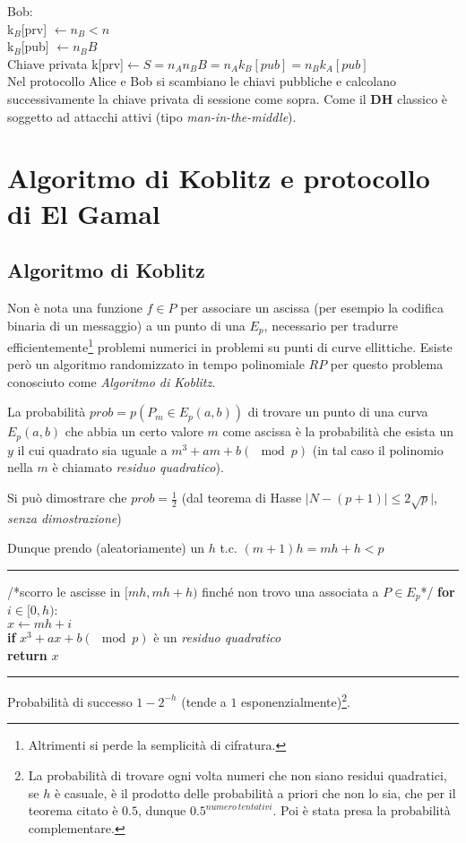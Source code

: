 \documentclass{article}
\begin{document}
Bob:\\
\indent\indent k$_B$[prv] $\leftarrow n_B < n$\\
\indent\indent k$_B$[pub] $\leftarrow n_B B$\\

Chiave privata k[prv]$\leftarrow S = n_A n_B B = n_A k_B [pub]= n_B k_A[pub]$\\
Nel protocollo Alice e Bob si scambiano le chiavi pubbliche e calcolano successivamente la chiave privata di sessione come sopra. Come il \textbf{DH} classico è soggetto ad attacchi attivi (tipo \textit{man-in-the-middle}).

\section{Algoritmo di Koblitz e protocollo di El Gamal}
\subsection{Algoritmo di Koblitz}
Non è nota una funzione $f\in P$ per associare un ascissa (per esempio la codifica binaria di un messaggio) a un punto di una $E_p$, necessario per tradurre efficientemente\footnote{Altrimenti si perde la semplicità di cifratura.} problemi numerici in problemi su punti di curve ellittiche. Esiste però un algoritmo randomizzato in tempo polinomiale $RP$ per questo problema conosciuto come \textit{Algoritmo di Koblitz}.

La probabilità $prob=p(P_m\in E_p(a,b))$ di trovare un punto di una curva $E_p(a,b)$ che abbia un certo valore $m$ come ascissa è la probabilità che esista un $y$ il cui quadrato sia uguale a $m^3+am+b (\mod{p})$ (in tal caso il polinomio nella $m$ è chiamato \textit{residuo quadratico}). 

Si può dimostrare che $prob = \frac{1}{2}$ (dal teorema di Hasse $|N-(p+1)|\le 2\sqrt{p}|$, \textit{senza dimostrazione})

Dunque prendo (aleatoriamente) un $h$ t.c. $(m+1)h=mh+h<p$\\
\hrule
/*scorro le ascisse in $[mh,mh+h)$ finché non trovo una associata a $P\in E_p$*/
\textbf{for} $i\in[0,h)$:\\
\indent\indent $x\leftarrow mh + i$\\

\indent\indent \textbf{if} $x^3+ax+b (\mod p)$ è un \textit{residuo quadratico} \\
\indent\indent\indent\indent \textbf{return} $x$\\
\hrule
Probabilità di successo $1-2^{-h}$ (tende a $1$ esponenzialmente)\footnote{La probabilità di trovare ogni volta numeri che non siano residui quadratici, se $h$ è casuale, è il prodotto delle probabilità a priori che non lo sia, che per il teorema citato è $0.5$, dunque $0.5^{numero\ tentativi}$. Poi è stata presa la probabilità complementare.}.
\end{document}
